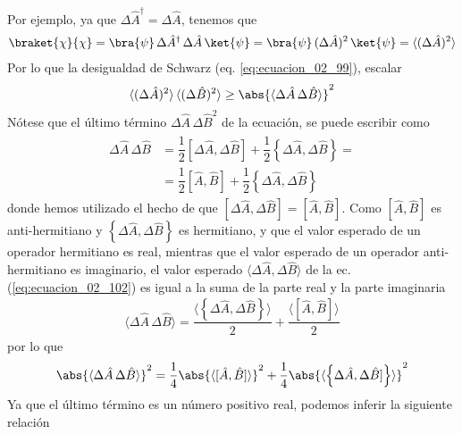 Por ejemplo, ya que $\Delta \hat{A}^{\dagger} = \Delta \hat{A}$, tenemos que
\begin{align*}
\braket{\chi}{\chi} = \bra{\psi} \, \Delta \hat{A}^{\dagger} \, \Delta \hat{A} \, \ket{\psi} = \bra{\psi} \, (\Delta \hat{A})^{2} \, \ket{\psi} = \langle (\Delta \hat{A})^{2} \rangle
\end{align*}
Por lo que la desigualdad de Schwarz (eq. \ref{eq:ecuacion_02_99}), escalar
\begin{equation}
\langle (\Delta \hat{A})^{2} \rangle \, \langle (\Delta \hat{B})^{2} \rangle \geq \abs{\langle \Delta \hat{A} \, \Delta \hat{B}\rangle}^{2} 
\label{eq:ecuacion_02_101}
\end{equation}
Nótese que el último término $\Delta \hat{A} \, \Delta \hat{B}^{2}$ de la ecuación, se puede escribir como
\begin{align}
\begin{aligned}
\Delta \hat{A} \, \Delta \hat{B} &= \dfrac{1}{2} [\Delta \hat{A} , \Delta \hat{B} ] + \dfrac{1}{2} \left\{ \Delta \hat{A} , \Delta \hat{B} \right\} = \\
&= \dfrac{1}{2} [\hat{A} , \hat{B} ] + \dfrac{1}{2} \left\{ \Delta \hat{A} , \Delta \hat{B} \right\}
\end{aligned}
\label{eq:ecuacion_02_102}
\end{align}
donde hemos utilizado el hecho de que $[\Delta \hat{A},\Delta \hat{B}]= [\hat{A}, \hat{B}]$. Como $[\hat{A}, \hat{B}]$ es anti-hermitiano y $\left\{ \Delta \hat{A},\Delta \hat{B} \right\}$ es hermitiano, y que el valor esperado de un operador hermitiano es real, mientras que el valor esperado de un operador anti-hermitiano es imaginario, el valor esperado $\langle \Delta \hat{A},\Delta \hat{B} \rangle$ de la ec. (\ref{eq:ecuacion_02_102}) es igual a la suma de la parte real y la parte imaginaria
\begin{align*}
\langle \Delta \hat{A} \, \Delta \hat{B} \rangle = \dfrac{\langle \left\{ \Delta \hat{A},\Delta \hat{B} \right\} \rangle}{2} + \dfrac{\langle [\hat{A}, \hat{B}] \rangle}{2}
\end{align*}
por lo que
\begin{equation}
\abs{ \langle \Delta \hat{A} \, \Delta \hat{B} \rangle}^{2} = \dfrac{1}{4} \abs{\langle [ \hat{A}, \hat{B} ] \rangle}^{2} + \dfrac{1}{4} \abs{ \langle \left\{ \Delta \hat{A}, \Delta \hat{B}] \right\} \rangle}^{2}
\label{eq:ecuacion_02_103}
\end{equation}
Ya que el último término es un número positivo real, podemos inferir la siguiente relación
